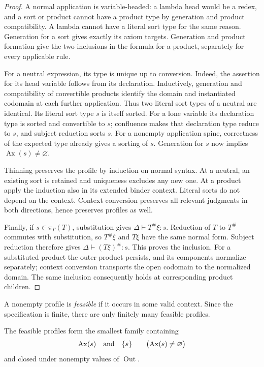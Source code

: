 \begin{proof}
A normal application is variable-headed: a lambda head would be a
redex, and a sort or product cannot have a product type by generation
and product compatibility. A lambda cannot have a literal sort type
for the same reason. Generation for a sort gives exactly its axiom
targets. Generation and product formation give the two inclusions in
the formula for a product, separately for every applicable rule.

For a neutral expression, its type is unique up to conversion. Indeed,
the assertion for its head variable follows from its declaration.
Inductively, generation and compatibility of convertible products
identify the domain and instantiated codomain at each further
application. Thus two literal sort types of a neutral are identical.
Its literal sort type $s$ is itself sorted. For a lone variable its
declaration type is sorted and convertible to $s$; confluence makes
that declaration type reduce to $s$, and subject reduction sorts $s$.
For a nonempty application spine, correctness of the expected type
already gives a sorting of $s$. Generation for $s$ now implies
$\operatorname{Ax}(s)\ne\varnothing$.

Thinning preserves the profile by induction on normal syntax. At a
neutral, an existing sort is retained and uniqueness excludes any new
one. At a product apply the induction also in its extended binder
context. Literal sorts do not depend on the context. Context conversion
preserves all relevant judgments in both directions, hence preserves
profiles as well.

Finally, if $s\in\pi_\Gamma(T)$, substitution gives
$\Delta\vdash T^\#\xi:s$. Reduction of $T$ to $T^\#$ commutes with
substitution, so $T^\#\xi$ and $T\xi$ have the same normal form.
Subject reduction therefore gives
$\Delta\vdash(T\xi)^\#:s$. This proves the inclusion. For a
substituted product the outer product persists, and its components
normalize separately; context conversion transports the open
codomain to the normalized domain. The same inclusion consequently
holds at corresponding product children.
\end{proof}

A nonempty profile is \emph{feasible} if it occurs in some valid
context. Since the specification is finite, there are only finitely
many feasible profiles.

\begin{lemma}
\label{lem:feasible-profiles}
The feasible profiles form the smallest family containing
\[
 \operatorname{Ax}(s)\quad\hbox{and}\quad\{s\}
       \qquad\bigl(\operatorname{Ax}(s)\ne\varnothing\bigr)
\]
and closed under nonempty values of $\operatorname{Out}$.
\end{lemma}

